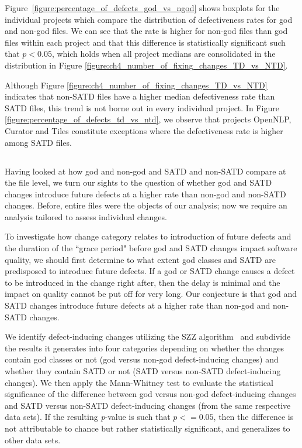 Figure~\ref{figure:percentage_of_defects_god_vs_ngod} shows boxplots for the individual projects which compare the distribution of defectiveness rates for god and non-god files. We can see that the rate is higher for non-god files than god files within each project and that this difference is statistically significant such that $p < 0.05$, which holds when all project medians are consolidated in the distribution in Figure \ref{figure:ch4_number_of_fixing_changes_TD_vs_NTD}.

Although Figure \ref{figure:ch4_number_of_fixing_changes_TD_vs_NTD} indicates that non-SATD files have a higher median defectiveness rate than SATD files, this trend is not borne out in every individual project. In Figure \ref{figure:percentage_of_defects_td_vs_ntd}, we observe that projects OpenNLP, Curator and Tiles constitute exceptions where the defectiveness rate is higher among SATD files.


\subsection*{\chapterIVrqII}


Having looked at how god and non-god and SATD and non-SATD compare at the file level, we turn our sights to the question of whether god and SATD changes introduce future defects at a higher rate than non-god and non-SATD changes. Before, entire files were the objects of our analysis; now we require an analysis tailored to assess individual changes.


To investigate how change category relates to introduction of future defects and the duration of the ``grace period" before god and SATD changes impact software quality, we should first determine to what extent god classes and SATD are predisposed to introduce future defects. If a god or SATD change causes a defect to be introduced in the change right after, then the delay is minimal and the impact on quality cannot be put off for very long. Our conjecture is that god and SATD changes introduce future defects at a higher rate than non-god and non-SATD changes.


We identify defect-inducing changes utilizing the SZZ algorithm~\cite{sliwerski-msr-2005} and subdivide the results it generates into four categories depending on whether the changes contain god classes or not (god versus non-god defect-inducing changes) and whether they contain SATD or not (SATD versus non-SATD defect-inducing changes). We then apply the Mann-Whitney test \cite{mann1947test} to evaluate the statistical significance of the difference between god versus non-god defect-inducing changes and SATD versus non-SATD defect-inducing changes (from the same respective data sets). If the resulting \textit{p}-value is such that $p <= 0.05$, then the difference is not attributable to chance but rather statistically significant, and generalizes to other data sets.


